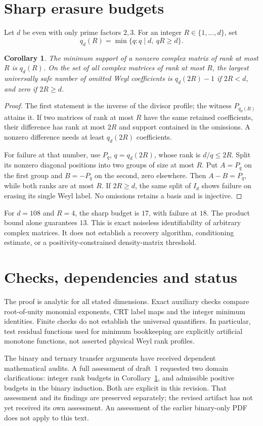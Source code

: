 \documentclass[11pt,a4paper]{article}
\newtheorem{corollary}[theorem]{Corollary}
\theoremstyle{remark}\newtheorem{remark}[theorem]{Remark}
\begin{document}
\section{Sharp erasure budgets}
Let $d$ be even with only prime factors $2,3$. For an integer $R\in\{1,\ldots,d\}$, set
\[
 q_d(R)=\min\{q:q\mid d,\ qR\ge d\}.
\]
\begin{corollary}\label{cor:erase}
The minimum support of a nonzero complex matrix of rank at most $R$ is
$q_d(R)$. On the set of all complex matrices of rank at most $R$,
the largest universally safe number of omitted Weyl coefficients is
$q_d(2R)-1$ if $2R<d$, and zero if $2R\ge d$.
\end{corollary}
\begin{proof}
The first statement is the inverse of the divisor profile; the witness
$P_{q_d(R)}$ attains it. If two matrices of rank at most $R$ have the
same retained coefficients, their difference has rank at most $2R$
and support contained in the omissions. A nonzero difference needs at
least $q_d(2R)$ coefficients.

For failure at that number, use $P_q$, $q=q_d(2R)$, whose rank is
$d/q\le2R$. Split its nonzero diagonal positions into two groups of
size at most $R$. Put $A=P_q$ on the first group and $B=-P_q$ on the
second, zero elsewhere. Then $A-B=P_q$, while both ranks are at most $R$.
If $2R\ge d$, the same split of $I_d$ shows failure on erasing its single
Weyl label. No omissions retains a basis and is injective.
\end{proof}
For $d=108$ and $R=4$, the sharp budget is $17$, with failure at $18$.
The product bound alone guarantees $13$. This is exact noiseless
identifiability of arbitrary complex matrices. It does not establish a
recovery algorithm, conditioning estimate, or a positivity-constrained
density-matrix threshold.

\section{Checks, dependencies and status}
The proof is analytic for all stated dimensions. Exact auxiliary checks
compare root-of-unity monomial exponents, CRT label maps and the integer
minimum identities. Finite checks do not establish the universal
quantifiers. In particular, test residual functions used for minimum
bookkeeping are explicitly artificial monotone functions, not asserted
physical Weyl rank profiles.

The binary and ternary transfer arguments have received dependent
mathematical audits. A full assessment of draft~1 requested two domain
clarifications: integer rank budgets in Corollary~\ref{cor:erase}, and
admissible positive budgets in the binary induction. Both are explicit in
this revision. That assessment and its findings are preserved separately;
the revised artifact has not yet received its own assessment. An assessment
of the earlier binary-only PDF does not apply to this text.
\end{document}
